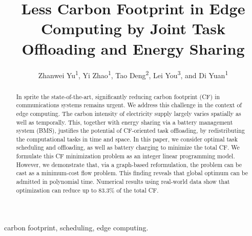 \documentclass[conference, 10pt, ﬁnal, letterpaper, twocolumn]{IEEEtran}
\begin{document}
\title{Less Carbon Footprint in Edge Computing by Joint Task Offloading and Energy Sharing}

 
\author{Zhanwei Yu\textsuperscript{1}, Yi Zhao\textsuperscript{1}, Tao Deng\textsuperscript{2}, Lei You\textsuperscript{3}, and Di Yuan\textsuperscript{1}}


\renewcommand*{\Affilfont}{\small}

\maketitle

\begin{abstract}
In sprite the state-of-the-art, significantly reducing carbon footprint (CF) in communications systems remains urgent. We address this challenge in the context of edge computing. The carbon intensity of electricity supply largely varies spatially as well as temporally. This, together with energy sharing via a battery management system (BMS), justifies the potential of CF-oriented task offloading, by redistributing the computational tasks in time and space. In this paper, we consider optimal task scheduling and offloading, as well as battery charging to minimize the total CF. We formulate this CF minimization problem as an integer linear programming model. However, we demonstrate that, via a graph-based reformulation, the problem can be cast as a minimum-cost flow problem. This finding reveals that global optimum can be admitted in polynomial time. Numerical results using real-world data show that optimization can reduce up to $83.3\%$ of the total CF.
\end{abstract}

\begin{IEEEkeywords}
carbon footprint, scheduling, edge computing.
\end{IEEEkeywords}
\end{document}
